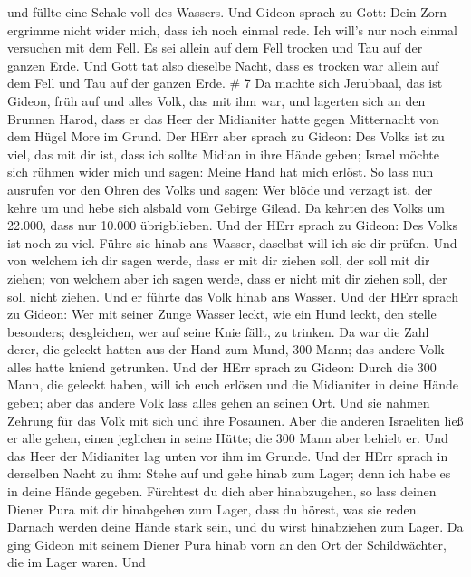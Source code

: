 und füllte eine Schale voll des Wassers.  Und Gideon sprach
zu Gott: Dein Zorn ergrimme nicht wider mich, dass ich noch einmal rede.
Ich will's nur noch einmal versuchen mit dem Fell. Es sei allein auf dem
Fell trocken und Tau auf der ganzen Erde.  Und Gott tat
also dieselbe Nacht, dass es trocken war allein auf dem Fell und Tau auf
der ganzen Erde. \# 7  Da machte sich Jerubbaal, das ist
Gideon, früh auf und alles Volk, das mit ihm war, und lagerten sich an
den Brunnen Harod, dass er das Heer der Midianiter hatte gegen
Mitternacht von dem Hügel More im Grund.  Der HErr aber
sprach zu Gideon: Des Volks ist zu viel, das mit dir ist, dass ich
sollte Midian in ihre Hände geben; Israel möchte sich rühmen wider mich
und sagen: Meine Hand hat mich erlöst.  So lass nun ausrufen
vor den Ohren des Volks und sagen: Wer blöde und verzagt ist, der kehre
um und hebe sich alsbald vom Gebirge Gilead. Da kehrten des Volks um
22.000, dass nur 10.000 übrigblieben.  Und der HErr sprach
zu Gideon: Des Volks ist noch zu viel. Führe sie hinab ans Wasser,
daselbst will ich sie dir prüfen. Und von welchem ich dir sagen werde,
dass er mit dir ziehen soll, der soll mit dir ziehen; von welchem aber
ich sagen werde, dass er nicht mit dir ziehen soll, der soll nicht
ziehen.  Und er führte das Volk hinab ans Wasser. Und der
HErr sprach zu Gideon: Wer mit seiner Zunge Wasser leckt, wie ein Hund
leckt, den stelle besonders; desgleichen, wer auf seine Knie fällt, zu
trinken.  Da war die Zahl derer, die geleckt hatten aus der
Hand zum Mund, 300 Mann; das andere Volk alles hatte kniend getrunken.
 Und der HErr sprach zu Gideon: Durch die 300 Mann, die
geleckt haben, will ich euch erlösen und die Midianiter in deine Hände
geben; aber das andere Volk lass alles gehen an seinen Ort. 
Und sie nahmen Zehrung für das Volk mit sich und ihre Posaunen. Aber die
anderen Israeliten ließ er alle gehen, einen jeglichen in seine Hütte;
die 300 Mann aber behielt er. Und das Heer der Midianiter lag unten vor
ihm im Grunde.  Und der HErr sprach in derselben Nacht zu
ihm: Stehe auf und gehe hinab zum Lager; denn ich habe es in deine Hände
gegeben.  Fürchtest du dich aber hinabzugehen, so lass
deinen Diener Pura mit dir hinabgehen zum Lager,  dass du
hörest, was sie reden. Darnach werden deine Hände stark sein, und du
wirst hinabziehen zum Lager. Da ging Gideon mit seinem Diener Pura hinab
vorn an den Ort der Schildwächter, die im Lager waren.  Und
